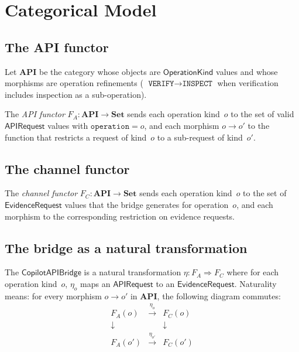 \documentclass[11pt]{article}
\newcommand{\Bridge}{\mathsf{CopilotAPIBridge}}
\newcommand{\APIReq}{\mathsf{APIRequest}}
\newcommand{\OpKind}{\mathsf{OperationKind}}
\newcommand{\EvReq}{\mathsf{EvidenceRequest}}
\begin{document}
\section{Categorical Model}\label{sec:categorical}

\subsection{The API functor}

\begin{definition}\label{def:apicat}
Let $\mathbf{API}$ be the category whose objects are
$\OpKind$ values and whose morphisms are operation
refinements (\eg{} $\texttt{VERIFY} \to \texttt{INSPECT}$
when verification includes inspection as a sub-operation).
\end{definition}

\begin{definition}\label{def:apifunctor}
The \emph{API functor} $F_A \colon \mathbf{API} \to \mathbf{Set}$
sends each operation kind~$o$ to the set of valid $\APIReq$
values with $\texttt{operation} = o$, and each morphism
$o \to o'$ to the function that restricts a request of
kind~$o$ to a sub-request of kind~$o'$.
\end{definition}

\subsection{The channel functor}

\begin{definition}\label{def:chanfunctor}
The \emph{channel functor}
$F_C \colon \mathbf{API} \to \mathbf{Set}$ sends each
operation kind~$o$ to the set of $\EvReq$ values that
the bridge generates for operation~$o$, and each morphism
to the corresponding restriction on evidence requests.
\end{definition}

\subsection{The bridge as a natural transformation}

\begin{definition}%
\label{def:bridgenat}
The $\Bridge$ is a natural transformation
$\eta \colon F_A \Rightarrow F_C$ where for each
operation kind~$o$, $\eta_o$ maps an $\APIReq$ to an
$\EvReq$.  Naturality means: for every morphism
$o \to o'$ in $\mathbf{API}$, the following diagram
commutes:
\[
\begin{array}{ccc}
  F_A(o) & \xrightarrow{\eta_o} & F_C(o) \\
  \downarrow & & \downarrow \\
  F_A(o') & \xrightarrow{\eta_{o'}} & F_C(o')
\end{array}
\]
\end{definition}
\end{document}
